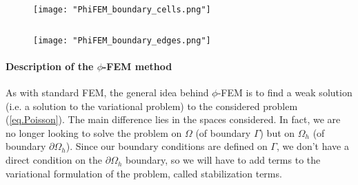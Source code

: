 \begin{minipage}{0.48\linewidth}
	\begin{figure}[H]
		\centering
		\texttt{[image: "PhiFEM\_boundary\_cells.png"]}
		\label{space4}
	\end{figure}
\end{minipage} $\qquad$
\begin{minipage}{0.48\linewidth}
	\begin{figure}[H]
		\centering
		\texttt{[image: "PhiFEM\_boundary\_edges.png"]}
		\label{space5}
	\end{figure}
\end{minipage}

\paragraph{Description of the $\phi$-FEM method} \label{FEMs.PhiFEM.Pres.method}

As with standard FEM, the general idea behind $\phi$-FEM is to find a weak solution (i.e. a solution to the variational problem) to the considered problem (\ref{eq.Poisson}). The main difference lies in the spaces considered. In fact, we are no longer looking to solve the problem on $\Omega$ (of boundary $\Gamma$) but on $\Omega_h$ (of boundary $\partial\Omega_h$). Since our boundary conditions are defined on $\Gamma$, we don't have a direct condition on the $\partial\Omega_h$ boundary, so we will have to add terms to the variational formulation of the problem, called stabilization terms.

